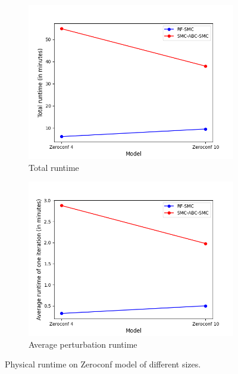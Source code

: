 \begin{figure}[H]
    \centering
    \begin{subfigure}{0.48\textwidth}
        \centering
        \includegraphics[width=\linewidth]{figures/zeroconf_runtime_total.png}
        \caption{Total runtime}
    \end{subfigure}
    \hfill
    \begin{subfigure}{0.48\textwidth}
        \centering
        \includegraphics[width=\linewidth]{figures/zeroconf_runtime_avg.png}
        \caption{Average perturbation runtime}
    \end{subfigure}
    \caption{Physical runtime on Zeroconf model of different sizes.}
\end{figure}

